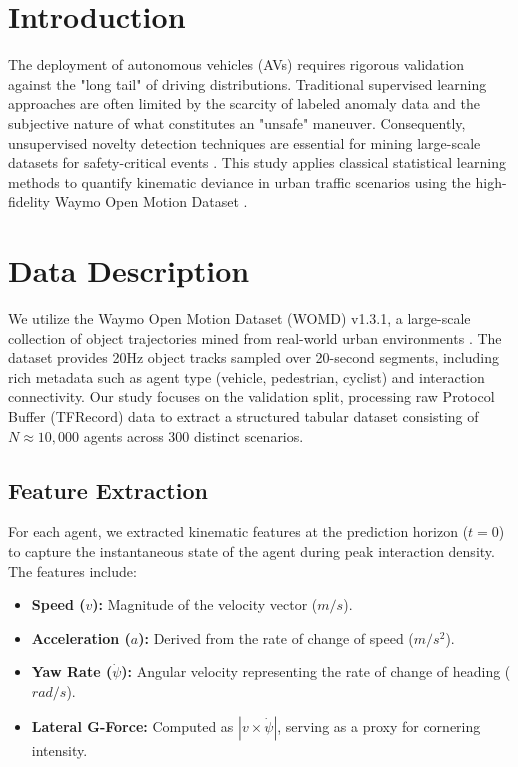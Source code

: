\documentclass[conference]{IEEEtran}
\begin{document}
\section{Introduction}
The deployment of autonomous vehicles (AVs) requires rigorous validation against the "long tail" of driving distributions. Traditional supervised learning approaches are often limited by the scarcity of labeled anomaly data and the subjective nature of what constitutes an "unsafe" maneuver. Consequently, unsupervised novelty detection techniques are essential for mining large-scale datasets for safety-critical events \cite{pimentel2014review}. This study applies classical statistical learning methods to quantify kinematic deviance in urban traffic scenarios using the high-fidelity Waymo Open Motion Dataset \cite{ettinger2021waymo}.

\section{Data Description}
We utilize the Waymo Open Motion Dataset (WOMD) v1.3.1, a large-scale collection of object trajectories mined from real-world urban environments \cite{sun2020scalability}. The dataset provides 20Hz object tracks sampled over 20-second segments, including rich metadata such as agent type (vehicle, pedestrian, cyclist) and interaction connectivity. Our study focuses on the validation split, processing raw Protocol Buffer (TFRecord) data to extract a structured tabular dataset consisting of $N \approx 10,000$ agents across 300 distinct scenarios.

\subsection{Feature Extraction}
For each agent, we extracted kinematic features at the prediction horizon ($t=0$) to capture the instantaneous state of the agent during peak interaction density. The features include:
\begin{itemize}
    \item \textbf{Speed ($v$):} Magnitude of the velocity vector ($m/s$).
    \item \textbf{Acceleration ($a$):} Derived from the rate of change of speed ($m/s^2$).
    \item \textbf{Yaw Rate ($\dot{\psi}$):} Angular velocity representing the rate of change of heading ($rad/s$).
    \item \textbf{Lateral G-Force:} Computed as $|v \times \dot{\psi}|$, serving as a proxy for cornering intensity.
\end{itemize}
\end{document}
